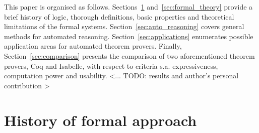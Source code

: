 \documentclass[article]{aaltoseries}
\begin{document}
This paper is organised as follows.
Sections~\ref{sec:formal_history} and~\ref{sec:formal_theory} provide a brief history of logic, thorough definitions, basic properties and theoretical limitations of the formal systems. Section~\ref{sec:auto_reasoning} covers general methods for automated reasoning. Section~\ref{sec:applications} enumerates possible application areas for automated theorem provers. Finally, Section~\ref{sec:comparison} presents the comparison of two aforementioned theorem provers, Coq and Isabelle, with respect to criteria s.a. expressiveness, computation power and usability.
<... TODO: results and author's personal contribution >



\section{History of formal approach}
\label{sec:formal_history}
\end{document}
